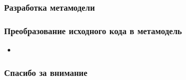 \documentclass{beamer}
\begin{document}
\begin{frame}
\frametitle{Разработка метамодели}


\end{frame}
\begin{frame}
\frametitle{Преобразование исходного кода в метамодель}

\begin{itemize}
    \item
\end{itemize}

\end{frame}
\begin{frame}
\frametitle{Спасибо за внимание}
\end{frame}
\end{document}
